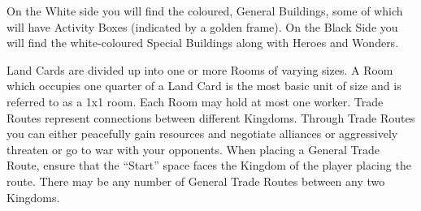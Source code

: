 \documentclass[10pt,twocolumn]{article}
\begin{document}
On the White side you will find the coloured, General Buildings, some of which will have Activity Boxes (indicated by a golden frame). On the Black Side you will find the white-coloured Special Buildings along with Heroes and Wonders.

Land Cards are divided up into one or more Rooms of varying sizes. A Room which occupies one quarter of a Land Card is the most basic unit of size and is referred to as a 1x1 room. Each Room may hold at most one worker.
Trade Routes represent connections between different Kingdoms. Through Trade Routes you can either peacefully gain resources and negotiate alliances or aggressively threaten or go to war with your opponents. When placing a General Trade Route, ensure that the ``Start'' space faces the Kingdom of the player placing the route. There may be any number of General Trade Routes between any two Kingdoms.
\end{document}
